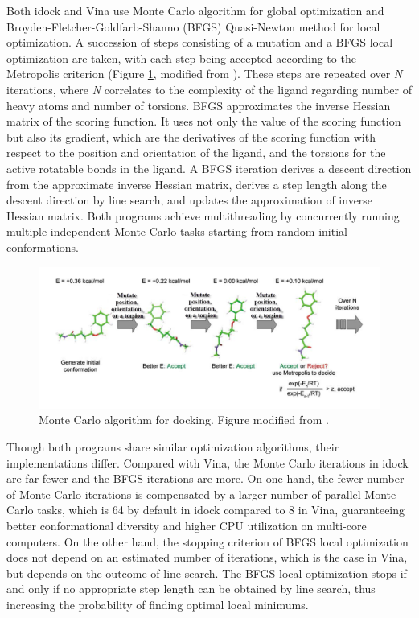 Both idock and Vina use Monte Carlo algorithm for global optimization and Broyden-Fletcher-Goldfarb-Shanno (BFGS) \cite{786} Quasi-Newton method for local optimization. A succession of steps consisting of a mutation and a BFGS local optimization are taken, with each step being accepted according to the Metropolis criterion (Figure \ref{idock:MonteCarlo}, modified from \cite{493}). These steps are repeated over \textit{N} iterations, where \textit{N} correlates to the complexity of the ligand regarding number of heavy atoms and number of torsions. BFGS approximates the inverse Hessian matrix of the scoring function. It uses not only the value of the scoring function but also its gradient, which are the derivatives of the scoring function with respect to the position and orientation of the ligand, and the torsions for the active rotatable bonds in the ligand. A BFGS iteration derives a descent direction from the approximate inverse Hessian matrix, derives a step length along the descent direction by line search, and updates the approximation of inverse Hessian matrix. Both programs achieve multithreading by concurrently running multiple independent Monte Carlo tasks starting from random initial conformations.

\begin{figure}
\centering
\includegraphics[width=\linewidth]{idock/MonteCarlo.png}
\caption{Monte Carlo algorithm for docking. Figure modified from \cite{493}.}
\label{idock:MonteCarlo}
\end{figure}

Though both programs share similar optimization algorithms, their implementations differ. Compared with Vina, the Monte Carlo iterations in idock are far fewer and the BFGS iterations are more. On one hand, the fewer number of Monte Carlo iterations is compensated by a larger number of parallel Monte Carlo tasks, which is 64 by default in idock compared to 8 in Vina, guaranteeing better conformational diversity and higher CPU utilization on multi-core computers. On the other hand, the stopping criterion of BFGS local optimization does not depend on an estimated number of iterations, which is the case in Vina, but depends on the outcome of line search. The BFGS local optimization stops if and only if no appropriate step length can be obtained by line search, thus increasing the probability of finding optimal local minimums.

